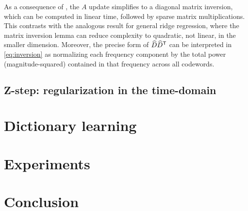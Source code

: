 \documentclass{article} %
\begin{document}
As a consequence of , the $A$ update simplifies to a diagonal matrix
inversion, which can be computed in linear time, followed by sparse matrix
multiplications.  This contrasts with the analogous result for general ridge regression, 
where the matrix inversion lemma can reduce complexity to quadratic, not linear, in the 
smaller dimension. 
Moreover, the precise form of $\widehat{D}\widehat{D}^\mathsf{T}$ can be interpreted in 
\eqref{eq:inversion} as normalizing each frequency component by the total power
(magnitude-squared) contained in that frequency across all codewords.

\subsection*{Z-step: regularization in the time-domain}


\section{Dictionary learning}

\section{Experiments}
\section{Conclusion}



\end{document}
